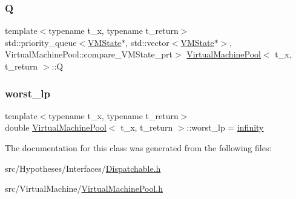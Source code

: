\mbox{\label{class_virtual_machine_pool_aab39827c242ded3fcc4675d2c24687a7}} 
\subsubsection{\texorpdfstring{Q}{Q}}
{\footnotesize\ttfamily template$<$typename t\+\_\+x, typename t\+\_\+return$>$ \\
std\+::priority\+\_\+queue$<$\hyperlink{class_virtual_machine_state}{V\+M\+State}$\ast$, std\+::vector$<$\hyperlink{class_virtual_machine_state}{V\+M\+State}$\ast$$>$, Virtual\+Machine\+Pool\+::compare\+\_\+\+V\+M\+State\+\_\+prt$>$ \hyperlink{class_virtual_machine_pool}{Virtual\+Machine\+Pool}$<$ t\+\_\+x, t\+\_\+return $>$\+::Q}

\mbox{\label{class_virtual_machine_pool_a9d5d6a1e078b9790f4193af8845d060f}} 
\subsubsection{\texorpdfstring{worst\+\_\+lp}{worst\_lp}}
{\footnotesize\ttfamily template$<$typename t\+\_\+x, typename t\+\_\+return$>$ \\
double \hyperlink{class_virtual_machine_pool}{Virtual\+Machine\+Pool}$<$ t\+\_\+x, t\+\_\+return $>$\+::worst\+\_\+lp = \hyperlink{_numerics_8h_a1bb1e42ae1b40cad6e99da0aab8a5576}{infinity}}



The documentation for this class was generated from the following files\+:\begin{DoxyCompactItemize}
\item 
src/\+Hypotheses/\+Interfaces/\hyperlink{_dispatchable_8h}{Dispatchable.\+h}\item 
src/\+Virtual\+Machine/\hyperlink{_virtual_machine_pool_8h}{Virtual\+Machine\+Pool.\+h}\end{DoxyCompactItemize}
